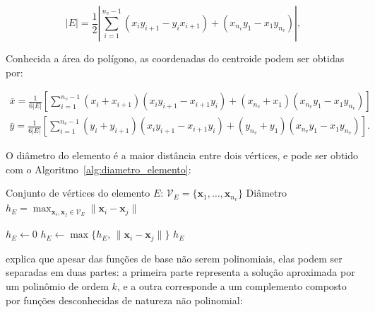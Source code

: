     \begin{equation}
        \vert{}E\vert{} = \frac{1}{2} \left\vert{} \sum_{i=1}^{n_v-1} (x_i y_{i+1} - y_i x_{i+1}) + (x_{n_v} y_1 - x_1 y_{n_v}) \right\vert{},
        \label{eq:4.1}
    \end{equation}

    \noindent Conhecida a área do polígono, as coordenadas do centroide podem ser obtidas por:
    
    \begin{equation}
        \begin{split}
            \bar{x}=\frac{1}{6\vert{}E\vert{}}\left[\sum_{i=1}^{n_v-1}(x_i+x_{i+1})(x_iy_{i+1}-x_{i+1}y_i)+(x_{n_v}+x_1)(x_{n_v}y_1-x_1y_{n_v})\right] \\
            \bar{y}=\frac{1}{6\vert{}E\vert{}}\left[\sum_{i=1}^{n_v-1}(y_i+y_{i+1})(x_iy_{i+1}-x_{i+1}y_i)+(y_{n_v}+y_1)(x_{n_v}y_1-x_1y_{n_v})\right].
        \end{split}
        \label{eq:4.2}
    \end{equation}

    \indent O diâmetro do elemento é a maior distância entre dois vértices, e pode ser obtido com o Algoritmo~\ref{alg:diametro_elemento}:

    \begin{algorithm}[H]
        \caption{Cálculo do diâmetro de um elemento}
        \label{alg:diametro_elemento}
        \begin{algorithmic}[1]
            \Require Conjunto de vértices do elemento $E$: $\mathcal{V}_E = \{\mathbf{x}_1, \dots, \mathbf{x}_{n_v}\}$
            \Ensure Diâmetro $h_E = \max_{\mathbf{x}_i, \mathbf{x}_j \in \mathcal{V}_E} \|\mathbf{x}_i - \mathbf{x}_j\|$

            \State $h_E \gets 0$
                    \State $h_E \gets \max\bigl\{h_E,\, \|\mathbf{x}_i - \mathbf{x}_j\|\bigr\}$
                \EndFor
            \EndFor
            \State \Return $h_E$
        \end{algorithmic}
    \end{algorithm}

    \indent \citet{manzini2017annotations} explica que apesar das funções de base não serem polinomiais, elas podem ser separadas em duas partes: a primeira parte representa a solução aproximada por um polinômio de ordem $k$, e a outra corresponde a um complemento composto por funções desconhecidas de natureza não polinomial: 

